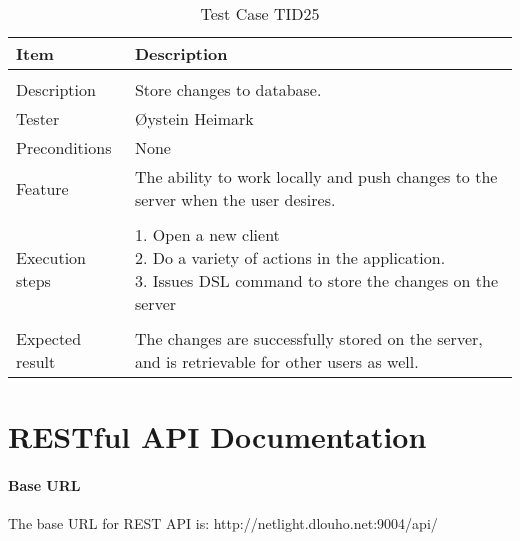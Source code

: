 \begin{table}
\caption{Test Case TID25}
\centering
\begin{tabular}{ l p{13cm} }
\hline 
 Item            & Description        \\ 
\hline \\ [-2.0ex]
 Description     &Store changes to database. \\ 
 Tester          & Øystein Heimark                  \\ 
 Preconditions   & None\\ 
 Feature         & The ability to work locally and push changes to the server when the user desires.   \vspace{3pt}                     \\ 
\hline \\ [-1.5ex]
 Execution steps & \pbox{13cm}{1. Open a new client \\ 2. Do a variety of actions in the application. \\ 3. Issues DSL command to store the changes on the server} \vspace{3pt} \\
\hline \\ [-1.5ex]
 Expected result & The changes are successfully stored on the server, and is retrievable for other users as well. \\
\hline 
\end{tabular}
\label{table:testcasetid25}
\end{table}


\clearpage

\chapter{RESTful API Documentation}

\subsubsection{Base URL}
The base URL for REST API is: http://netlight.dlouho.net:9004/api/

